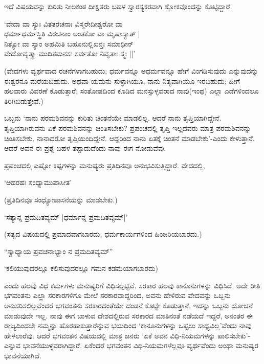 ಇದೆ ವಿಷಯವನ್ನು ಕುರಿತು ನೀಲಕಂಠ ದೀಕ್ಷಿತರು ಬಹಳ ಸ್ವಾರಸ್ಯಕರವಾಗಿ ಶ್ಲೋಕವೊಂದನ್ನು ಕೊಟ್ಟಿದ್ದಾರೆ.

\begin{shloka}
`ವೇದಾ ವಾ ಸ್ಯುಃ ವಿತತರಚನಾಃ ವಿಸ್ಮರೇದೀಶ್ವರೋ ವಾ\\
ಧರ್ಮಾಧರ್ಮಸ್ಥಿತಿ ವಿರಚನಾಂ ಅಂತಕೋ ವಾ ಮೃಷಾಸ್ಯಾತ್ |\\
ನಿತ್ಯೋ ವಾ ಸ್ಯಾಂ ಅಹಮಿತಿ ಬಹೂನುಲ್ಲಿಖನ್ತಃ ಸಮಾಧೀನ್\\
ವೇದೋವೃತ್ತ್ಯಾ ಮುದಿತಮನಸಃ ಸರ್ವತೋ ನಿವೃತಾಃ ಸ್ಮಃ ||'
\end{shloka}

(ವೇದಗಳು ವ್ಯರ್ಥವಾದ ರಚನೆಗಳಾಗಬಹುದು; ಧರ್ಮವನ್ನೂ ಅಧರ್ಮವನ್ನೂ ಹೇಗೆ ವಿಂಗಡಿಸುವುದು ಎನ್ನುವುದನ್ನು ಈಶ್ವರನೂ ಮರೆಯಬಹುದು. ಅಥವಾ ಯಮನು ಸುಳ್ಳಾಗಿಯೂ, ನಾನು ನಿತ್ಯವಾಗಿಯೂ ಇರಬಹುದು; ಹೀಗೆ ಹಲವಾರು ವಿವರಣೆ ಕೊಡುತ್ತಾರೆ; ಸಂತೋಷದಿಂದ ಕೂಡಿದ ಮನಸ್ಸುಳ್ಳವರಾದ ನಾವು(ಇಂಥ) ಎಲ್ಲಾ ಎಡೆಗಳಿಂದಲೂ ತಿರಿಗಿಬಿಡುತ್ತೇವೆ.)

ಒಬ್ಬನು `ನಾನು ಪರಮಶಿವನನ್ನು ಕುರಿತು ಚಿಂತನೆಯೇ ಮಾಡಲಿಲ್ಲ. ಆದರೆ ನಾನು ತೃಪ್ತಿಯಾಗಿದ್ದೇನೆ. ತೃಪ್ತಿಯಾಗಿರುವನು ಏಕೆ ಪರಮಶಿವನನ್ನು ಚಿಂತಿಸಬೇಕು? ಪ್ರಪಂಚದಲ್ಲಿ ತೃಪ್ತಿ ಇಲ್ಲದವರು ಮಾತ್ರ ಪರಮಶಿವನನ್ನು ಚಿಂತಿಸಬೇಕು. ನಾನಾದರೋ ತೃಪ್ತಿಯಿಂದಿದ್ದೇನೆ. ಆದ್ದರಿಂದ ನಾನು ಏತಕ್ಕೆ ಚಿಂತನೆ ಮಾಡಬೇಕು'-ಎಂದು ಕೇಳುತ್ತಾನೆ. ಆದರೆ ಅವನ ಈ ಪ್ರಶ್ನೆ ಬಹಳ ತಪ್ಪಾದುದೆಂದು ನಾವು ಈಗ ನೋಡುವೆವು.

ಪ್ರಪಂಚದಲ್ಲಿ ಎಷ್ಟೋ ಕಷ್ಟಗಳನ್ನು ಮನುಷ್ಯರು ಪ್ರತಿದಿನವೂ ಅನುಭವಿಸುತ್ತಿದ್ದಾರೆ. ವೇದದಲ್ಲಿ,

\begin{shloka}
`ಅಹರಹಃ ಸಂಧ್ಯಾಮುಪಾಸೀತ'
\end{shloka}

(ಪ್ರತಿದಿನವೂ ಸಂಧ್ಯೋಪಾಸನೆಯನ್ನು ಮಾಡಬೇಕು.)

\begin{shloka}
`ಸತ್ಯಾನ್ನ ಪ್ರಮದಿತವ್ಯಮ್ |ಧರ್ಮಾನ್ನ ಪ್ರಮದಿತವ್ಯಮ್|'
\end{shloka}

(ಸತ್ಯದ ವಿಷಯದಲ್ಲಿ ಪ್ರಮಾದವಾಗಬಾರದು, ಧರ್ಮಕಾರ್ಯಗಳಿಂದ ಹಿಂಜರಿಯಬಾರದು.)

\begin{shloka}
``ಸ್ವಾಧ್ಯಾಯ ಪ್ರವಚನಾಭ್ಯಾಂ ನ ಪ್ರಮದಿತವ್ಯಮ್''
\end{shloka}

`ಕಲಿಯುವುದರಲ್ಲೂ ಕಲಿಸುವುದರಲ್ಲೂ ಗಮನ ಕಡಮೆಯಾಗಬಾರದು)

ಎಂದು ಹಲವು ವಿಧ ಕರ್ಮಗಳು ಮನುಷ್ಯರಿಗೆ ವಿಧಿಸಲ್ಪಟ್ಟಿವೆ. ಸರಕಾರ ಹಲವು ಕಾನೂನುಗಳನ್ನು ವಿಧಿಸಿದೆ. ಅದೇ ರೀತಿ ಭಗವಂತನು ಎಲ್ಲಾ ಸರಕಾರಗಳಿಗೂ ಮೇಲೆ ಸರಕಾರವಾದ್ದರಿಂದ, ಅವನು ಹೇಳಿರುವ ವೇದವನ್ನು ಒಬ್ಬನು ಅನುಸರಿಸಲಿಲ್ಲವೆಂದರೆ ಭಗವಂತನು ಸರಕಾರದಂತೆಯೇ ದಂಡನೆ ಕೊಟ್ಟೇ ಕೊಡುತ್ತಾನೆ. ಇದನ್ನು ಒಬ್ಬನು ಯೋಚನೆ ಮಾಡುವುದೇ ಇಲ್ಲ. ನಾವು ಈಗ ಬಾಳುವ ದೇಶದಲ್ಲಿರುವ ಸರಕಾರದ ಮಾತಿನಂತೆ ನಡೆಯದೆ ಇದ್ದರೆ, ಅನಂತರ ಈ ರಾಜ್ಯದಿಂದಲೇ ನಮ್ಮನ್ನು ಹೊರಹಾಕುತ್ತಾರೆನ್ನುವ ಭಯದಿಂದ `ಕಾನೂನುಗಳನ್ನು ಒಪ್ಪಲು ಸಾಧ್ಯವಿಲ್ಲ'ವೆಂದು ನಾವು ಹೇಳಲಾರೆವು. ಆದರೆ ಭಗವಂತನ ವಿಷಯದಲ್ಲಿ ಮಾತ್ರ ಜನರು `ಏಕೆ ಅವನ ವಿಧಿ-ನಿಯಮಗಳನ್ನು ಪಾಲಿಸಬೇಕು'-ಎನ್ನುವ ಭಾವನೆಯುಳ್ಳವರಾಗಿದ್ದಾರೆ. ಏಕೆಂದರೆ ಭಗವಂತನ ವಿಧಿ-ನಿಯಮಗಳೆಲ್ಲವೂ ವ್ಯರ್ಥವೆಂದು ಅಂಥಾ ಮನುಷ್ಯರ ಭಾವನೆಯಾಗಿದೆ.

